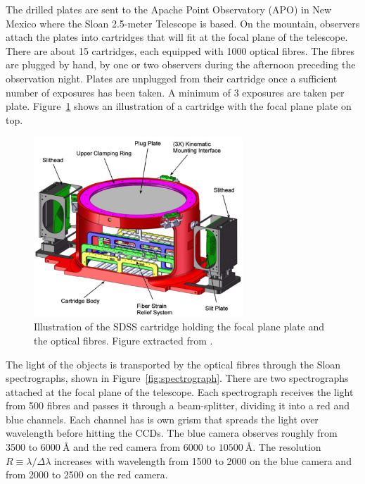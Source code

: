 The drilled plates are sent to the Apache Point Observatory (APO) in New Mexico
where the Sloan 2.5-meter Telescope is based. On the mountain, 
observers attach the plates into cartridges that will fit at the focal plane of the
telescope. There are about 15 cartridges, each equipped with 1000 optical fibres.
The fibres are plugged by hand, by one or two observers during the afternoon preceding 
the observation night. Plates are unplugged from their cartridge once a sufficient
number of exposures has been taken. A minimum of 3 exposures are taken per plate.
Figure~\ref{fig:cartridge} shows an illustration of a cartridge with the focal plane 
plate on top.

\begin{figure}[t]
    \centering 
    \includegraphics[width=0.7\textwidth]{fig/spectro/cartridge.png}
    \caption{Illustration of the SDSS cartridge holding the focal plane plate and the optical fibres. 
    Figure extracted from \cite{smeeMultiobjectFiberfedSpectrographs2013}. }
    \label{fig:cartridge}
\end{figure}
 
The light of the objects is transported by the optical fibres through the 
Sloan spectrographs, shown in Figure~\ref{fig:spectrograph}. 
There are two spectrographs attached at the focal plane
of the telescope. Each spectrograph receives the light from 500 fibres and passes 
it through a beam-splitter, dividing it into a red and blue channels. 
Each channel has is own grism that spreads the light over wavelength before
hitting the CCDs. The blue camera observes roughly from 3500 to $\qty{6000}{\angstrom}$ and the red
camera from 6000 to $\qty{10500}{\angstrom}$. The resolution $R \equiv \lambda / \Delta \lambda$ 
increases with wavelength from 1500 to 2000 on the blue camera and from 2000 to 2500 
on the red camera. 


